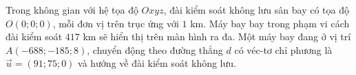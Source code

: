 \begin{ex}%
	Trong không gian với hệ tọa độ $Oxyz$, đài kiểm soát không lưu sân bay có tọa độ $O(0;0;0)$, mỗi đơn vị trên trục ứng với $1$ km. Máy bay bay trong phạm vi cách đài kiểm soát $417$ km sẽ hiển thị trên màn hình ra đa. Một máy bay đang ở vị trí $A\left(-688;-185;8\right)$, chuyển động theo đường thẳng $d$ có véc-tơ chỉ phương là $\vec{u}=(91;75;0)$ và hướng về đài kiểm soát không lưu.
	\begin{center}
\end{center}
\end{ex}
